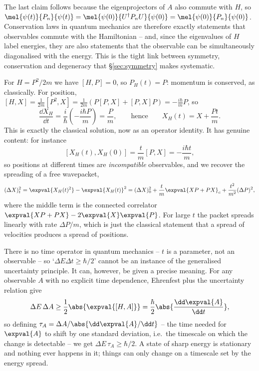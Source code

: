 The last claim follows because the eigenprojectors of $A$ also commute with $H$, so $\mel{\psi(t)}{P_n}{\psi(t)} = \mel{\psi(0)}{U^\dagger P_n U}{\psi(0)} = \mel{\psi(0)}{P_n}{\psi(0)}$. Conservation laws in quantum mechanics are therefore exactly statements that observables commute with the Hamiltonian -- and, since the eigenvalues of $H$ label energies, they are also statements that the observable can be simultaneously diagonalised with the energy. This is the tight link between symmetry, conservation and degeneracy that \S\ref{sec:symmetry} makes systematic.

\begin{example}
    For $H = P^2/2m$ we have $[H,P] = 0$, so $P_H(t) = P$: momentum is conserved, as classically. For position, $[H, X] = \frac{1}{2m}[P^2, X] = \frac{1}{2m}\left(P[P,X] + [P,X]P\right) = -\frac{i\hbar}{m}P$, so
    $$
    \frac{\dd X_H}{\dd t} = \frac{i}{\hbar}\left(-\frac{i\hbar P}{m}\right) = \frac{P}{m}, \qquad \text{hence} \qquad X_H(t) = X + \frac{P t}{m}.
    $$
    This is exactly the classical solution, now as an operator identity. It has genuine content: for instance
    $$
    [X_H(t), X_H(0)] = \frac{t}{m}[P, X] = -\frac{i\hbar t}{m},
    $$
    so positions at different times are \emph{incompatible} observables, and we recover the spreading of a free wavepacket,
    $$
    (\Delta X)_t^2 = \expval{X_H(t)^2} - \expval{X_H(t)}^2 = (\Delta X)_0^2 + \frac{t}{m}\expval{XP + PX}_c + \frac{t^2}{m^2}(\Delta P)^2,
    $$
    where the middle term is the connected correlator $\expval{XP+PX} - 2\expval{X}\expval{P}$. For large $t$ the packet spreads linearly with rate $\Delta P/m$, which is just the classical statement that a spread of velocities produces a spread of positions.
\end{example}

\begin{remark}
    There is no time operator in quantum mechanics -- $t$ is a parameter, not an observable -- so `$\Delta E \Delta t \geq \hbar/2$' cannot be an instance of the generalised uncertainty principle. It can, however, be given a precise meaning. For any observable $A$ with no explicit time dependence, Ehrenfest plus the uncertainty relation give
    $$
    \Delta E \, \Delta A \geq \frac{1}{2}\abs{\expval{[H,A]}} = \frac{\hbar}{2}\abs{\frac{\dd \expval{A}}{\dd t}},
    $$
    so defining $\tau_A = \Delta A / \abs{\dd\expval{A}/\dd t}$ -- the time needed for $\expval{A}$ to shift by one standard deviation, i.e.\ the timescale on which the change is detectable -- we get $\Delta E \, \tau_A \geq \hbar/2$. A state of sharp energy is stationary and nothing ever happens in it; things can only change on a timescale set by the energy spread.
\end{remark}

